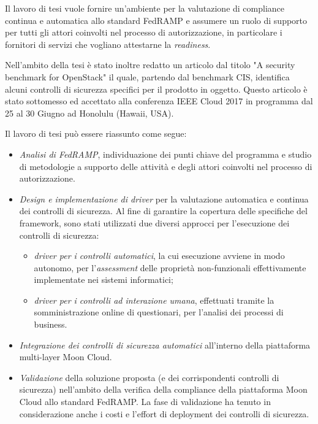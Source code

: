 \documentclass[../main.tex]{subfiles}
\begin{document}
Il lavoro di tesi vuole fornire un'ambiente per la valutazione di compliance continua e automatica allo standard FedRAMP e assumere un ruolo di supporto per tutti gli attori coinvolti nel processo di autorizzazione, in particolare i fornitori di servizi che vogliano attestarne la \textit{readiness}.


Nell'ambito della tesi è stato inoltre redatto un articolo dal titolo "A security benchmark for OpenStack" il quale, partendo dal benchmark CIS, identifica alcuni controlli di sicurezza specifici per il prodotto in oggetto.
Questo articolo è stato sottomesso ed accettato alla conferenza IEEE Cloud 2017 in programma dal 25 al 30 Giugno ad Honolulu (Hawaii, USA).


Il lavoro di tesi può essere riassunto come segue:
\begin{itemize}
\item \textit{Analisi di FedRAMP}, individuazione dei punti chiave del programma e studio di metodologie a supporto delle attività e degli attori coinvolti nel processo di autorizzazione.
\item \textit{Design e implementazione di driver} per la valutazione automatica e continua dei controlli di sicurezza.
Al fine di garantire la copertura delle specifiche del framework, sono stati utilizzati due diversi approcci per l'esecuzione dei controlli di sicurezza:
\begin{itemize}
\item \textit{driver per i controlli automatici}, la cui esecuzione avviene in modo autonomo, per l'\textit{assessment} delle proprietà non-funzionali effettivamente implementate nei sistemi informatici;
\item \textit{driver per i controlli ad interazione umana}, effettuati tramite la somministrazione online di questionari, per l'analisi dei processi di business.
\end{itemize}
\item \textit{Integrazione dei controlli di sicurezza automatici} all'interno della piattaforma multi-layer Moon Cloud.
\item \textit{Validazione} della soluzione proposta (e dei corrispondenti controlli di sicurezza) nell'ambito della verifica della compliance della piattaforma Moon Cloud allo standard FedRAMP. La fase di validazione ha tenuto in considerazione anche i costi e l'effort di deployment dei controlli di sicurezza.
\end{itemize}
\end{document}
